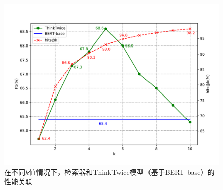 \begin{figure}[htbp]
    \centering
    \includegraphics[scale=0.6]{figure/3-2.pdf}
    \caption{在不同$k$值情况下，检索器和ThinkTwice模型（基于BERT-base）的性能关联}
    \label{fig:3-2}
\end{figure}
